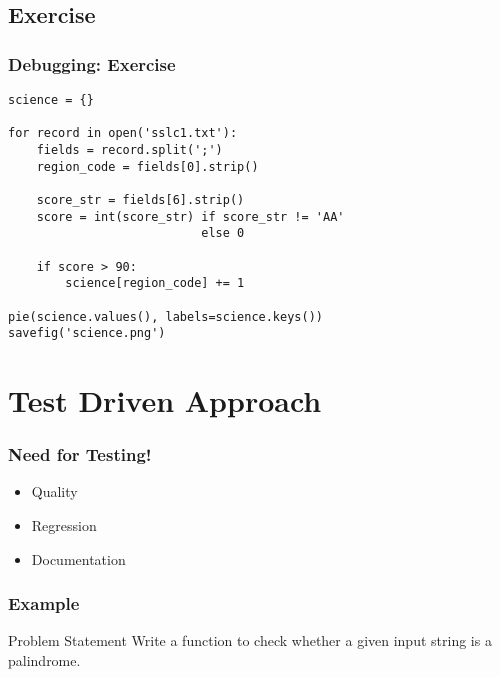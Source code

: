 \documentclass[compress,14pt]{beamer}
\newcommand{\emphbar}[1]
{\begin{beamercolorbox}[rounded=true]{emphbar} 
      {#1}
 \end{beamercolorbox}
}
\newcounter{time}
\newcommand{\inctime}[1]{\addtocounter{time}{#1}{\vspace*{0.1in}\tiny \thetime\ m}}
\begin{document}
\subsection{Exercise}
\begin{frame}[fragile]
\frametitle{Debugging: Exercise}
\small
\begin{lstlisting}
science = {}

for record in open('sslc1.txt'):
    fields = record.split(';')
    region_code = fields[0].strip()

    score_str = fields[6].strip()
    score = int(score_str) if score_str != 'AA' 
                           else 0

    if score > 90:
        science[region_code] += 1

pie(science.values(), labels=science.keys())
savefig('science.png')
\end{lstlisting}
\inctime{10}
\end{frame}

   



\section{Test Driven Approach}
\begin{frame}
    \frametitle{Need for Testing!}
   
    \begin{itemize}
        \item Quality
        \item Regression
        \item Documentation
    \end{itemize}
\end{frame}

\begin{frame}[fragile]
    \frametitle{Example}
    \begin{block}{Problem Statement}
      Write a function to check whether a given input
      string is a palindrome.
    \end{block}
\end{frame}
\end{document}
